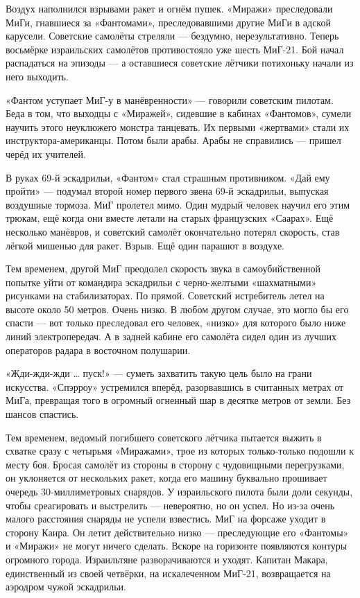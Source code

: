 Воздух наполнился взрывами ракет и огнём пушек. «Миражи» преследовали МиГи, гнавшиеся за «Фантомами», преследовавшими другие МиГи в адской карусели. Советские самолёты стреляли — бездумно, нерезультативно. Теперь восьмёрке израильских самолётов противостояло уже шесть МиГ-21. Бой начал распадаться на эпизоды — а оставшиеся советские лётчики потихоньку начали из него выходить.

«Фантом уступает МиГ-у в манёвренности» — говорили советским пилотам. Беда в том, что выходцы с «Миражей», сидевшие в кабинах «Фантомов», сумели научить этого неуклюжего монстра танцевать. Их первыми «жертвами» стали их инструктора-американцы. Потом были арабы. Арабы не справились — пришел черёд их учителей.

В руках 69-й эскадрильи, «Фантом» стал страшным противником. «Дай ему пройти» — подумал второй номер первого звена 69-й эскадрильи, выпуская воздушные тормоза. МиГ пролетел мимо. Один мудрый человек научил его этим трюкам, ещё когда они вместе летали на старых французских «Саарах». Ещё несколько манёвров, и советский самолёт окончательно потерял скорость, став лёгкой мишенью для ракет. Взрыв. Ещё один парашют в воздухе.

Тем временем, другой МиГ преодолел скорость звука в самоубийственной попытке уйти от командира эскадрильи с черно-желтыми «шахматными» рисунками на стабилизаторах. По прямой. Советский истребитель летел на высоте около 50 метров. Очень низко. В любом другом случае, это могло бы его спасти — вот только преследовал его человек, «низко» для которого было ниже линий электропередач. А в задней кабине его самолёта сидел один из лучших операторов радара в восточном полушарии.

«Жди-жди-жди … пуск!» — суметь захватить такую цель было на грани искусства. «Спэрроу» устремился вперёд, разорвавшись в считанных метрах от МиГа, превращая того в огромный огненный шар в десятке метров от земли. Без шансов спастись.

Тем временем, ведомый погибшего советского лётчика пытается выжить в схватке сразу с четырьмя «Миражами», трое из которых только-только подошли к месту боя. Бросая самолёт из стороны в сторону с чудовищными перегрузками, он уклоняется от нескольких ракет, когда его машину буквально прошивает очередь 30-миллиметровых снарядов. У израильского пилота были доли секунды, чтобы среагировать и выстрелить — невероятно, но он успел. Но из-за очень малого расстояния снаряды не успели взвестись. МиГ на форсаже уходит в сторону Каира. Он летит действительно низко — преследующие его «Фантомы» и «Миражи» не могут ничего сделать. Вскоре на горизонте появляются контуры огромного города. Израильтяне разворачиваются и уходят. Капитан Макара, единственный из своей четвёрки, на искалеченном МиГ-21, возвращается на аэродром чужой эскадрильи.

